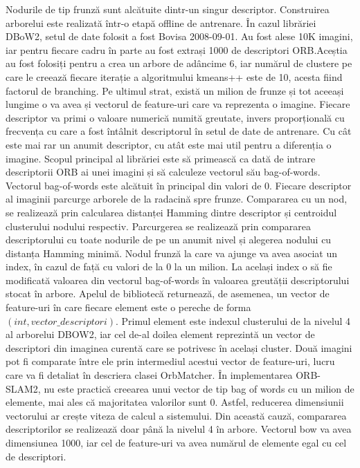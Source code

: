 \documentclass[12pt,a4paper]{report}
\begin{document}
Nodurile de tip frunză sunt alcătuite dintr-un singur descriptor. Construirea arborelui este realizată într-o 
etapă offline de antrenare. În cazul librăriei DBoW2, setul de date folosit a fost Bovisa 2008{-}09{-}01. 
Au fost alese 10K imagini, iar pentru fiecare cadru în parte au fost extrași 1000 de descriptori ORB.\@ Aceștia au 
fost folosiți pentru a crea un arbore de adâncime 6, iar numărul de clustere pe care le creează fiecare 
iterație a algoritmului kmeans++ este de 10, acesta fiind factorul de branching. Pe ultimul strat, există un milion 
de frunze și tot aceeași lungime o va avea și vectorul de feature-uri care va reprezenta o imagine. Fiecare
descriptor va primi o valoare numerică numită greutate, invers proporțională cu frecvența cu care a fost 
întâlnit descriptorul în setul de date de antrenare. Cu cât este mai rar un anumit descriptor, cu atât este
mai util pentru a diferenția o imagine. Scopul principal al librăriei este să primească ca dată
de intrare descriptorii ORB ai unei imagini și să calculeze vectorul său bag-of-words.
Vectorul bag-of-words este alcătuit în principal din valori de 0. Fiecare descriptor al 
imaginii parcurge arborele de la radacină spre frunze. Compararea cu un nod, se realizează 
prin calcularea distanței Hamming dintre descriptor și centroidul clusterului nodului respectiv.
Parcurgerea se realizează prin compararea descriptorului cu toate nodurile de pe un anumit nivel
și alegerea nodului cu distanța Hamming minimă. Nodul frunză la care va ajunge va avea asociat
un index, în cazul de față cu valori de la 0 la un milion. La același index o să fie modificată
valoarea din vectorul bag-of-words în valoarea greutății descriptorului stocat în arbore.
Apelul de bibliotecă returnează, de asemenea, un vector de feature-uri în care fiecare element
este o pereche de forma $ (int, vector\_descriptori) $. Primul element este indexul 
clusterului de la nivelul 4 al arborelui DBOW2, iar cel de-al doilea element reprezintă un 
vector de descriptori din imaginea curentă care se potrivesc în același cluster. Două imagini pot
fi comparate între ele prin intermediul acestui vector de feature-uri, lucru care va fi detaliat
în descriera clasei OrbMatcher. În implementarea ORB-SLAM2, nu este practică creearea unui vector
de tip bag of words cu un milion de elemente, mai ales că majoritatea valorilor sunt 0. Astfel,
reducerea dimensiunii vectorului ar crește viteza de calcul a sistemului. Din această 
cauză, compararea descriptorilor se realizează doar până la nivelul 4 în arbore. Vectorul bow 
va avea dimensiunea 1000, iar cel de feature-uri va avea numărul de elemente egal cu cel de 
descriptori. 
\end{document}
